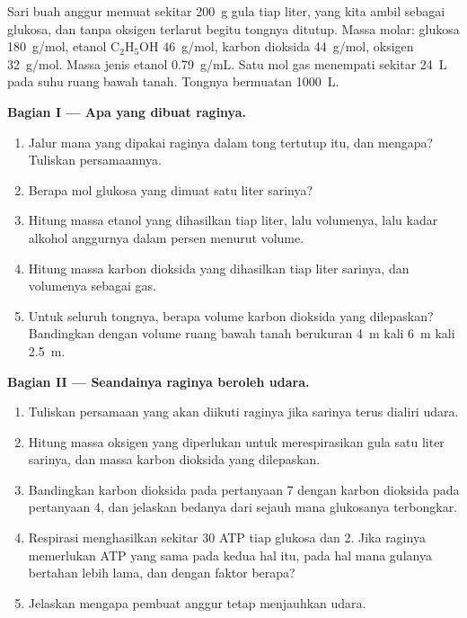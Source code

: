 \begin{problem}
\label{pb:g10:cell-metabolism:1}
Sari buah anggur memuat sekitar \qty{200}{g} gula tiap liter, yang kita
ambil sebagai glukosa, dan tanpa oksigen terlarut begitu tongnya
ditutup. Massa molar: glukosa \qty{180}{g/mol}, etanol
$\mathrm{C_2H_5OH}$ \qty{46}{g/mol}, karbon dioksida \qty{44}{g/mol},
oksigen \qty{32}{g/mol}. Massa jenis etanol \qty{0.79}{g/mL}. Satu mol
gas menempati sekitar \qty{24}{L} pada suhu ruang bawah tanah. Tongnya
bermuatan \qty{1000}{L}.

\medskip
\noindent\textbf{Bagian I --- Apa yang dibuat raginya.}
\begin{enumerate}
  \item Jalur mana yang dipakai raginya dalam tong tertutup itu, dan
        mengapa? Tuliskan persamaannya.
  \item Berapa mol glukosa yang dimuat satu liter sarinya?
  \item Hitung massa etanol yang dihasilkan tiap liter, lalu volumenya,
        lalu kadar alkohol anggurnya dalam persen menurut volume.
  \item Hitung massa karbon dioksida yang dihasilkan tiap liter
        sarinya, dan volumenya sebagai gas.
  \item Untuk seluruh tongnya, berapa volume karbon dioksida yang
        dilepaskan? Bandingkan dengan volume ruang bawah tanah
        berukuran \qty{4}{m} kali \qty{6}{m} kali \qty{2.5}{m}.
\end{enumerate}

\medskip
\noindent\textbf{Bagian II --- Seandainya raginya beroleh udara.}
\begin{enumerate}[resume]
  \item Tuliskan persamaan yang akan diikuti raginya jika sarinya terus
        dialiri udara.
  \item Hitung massa oksigen yang diperlukan untuk merespirasikan gula
        satu liter sarinya, dan massa karbon dioksida yang dilepaskan.
  \item Bandingkan karbon dioksida pada pertanyaan 7 dengan karbon
        dioksida pada pertanyaan 4, dan jelaskan bedanya dari sejauh
        mana glukosanya terbongkar.
  \item Respirasi menghasilkan sekitar 30 ATP tiap glukosa dan
         2. Jika raginya memerlukan ATP yang sama pada kedua
        hal itu, pada hal mana gulanya bertahan lebih lama, dan dengan faktor berapa?
  \item Jelaskan mengapa pembuat anggur tetap menjauhkan udara.
\end{enumerate}


\end{problem}

